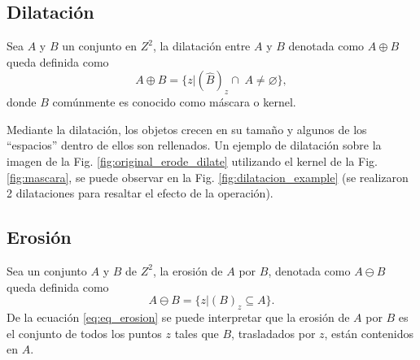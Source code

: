 \subsection{Dilatación}
Sea $A$ y $B$ un conjunto en $Z^2$, la dilatación entre $A$ y $B$ denotada como $A \oplus B$ queda definida como
\begin{equation}
A\oplus B=\{z|(\hat{B})_{z}\cap\; A \neq \varnothing\},
\label{eq:eq_dilatacion}
\end{equation}
donde $B$ comúnmente es conocido como máscara o kernel.

Mediante la dilatación, los objetos crecen en su tamaño y algunos de los ``espacios'' dentro de ellos son rellenados. Un ejemplo de dilatación sobre la imagen de la Fig. \ref{fig:original_erode_dilate} utilizando el kernel de la Fig. \ref{fig:mascara}, se puede observar en la Fig. \ref{fig:dilatacion_example} (se realizaron 2 dilataciones para resaltar el efecto de la operación).
\subsection{Erosión}
Sea un conjunto $A$ y $B$ de $Z^2$, la erosión de $A$ por $B$, denotada como $A \ominus B$ queda definida como
\begin{equation}
A \ominus B=\{z|(B)_{z} \subseteq A\}.
\label{eq:eq_erosion}
\end{equation}
De la ecuación \eqref{eq:eq_erosion} se puede interpretar que la erosión de $A$ por $B$ es el conjunto de todos los puntos $z$ tales que $B$, trasladados por $z$, están contenidos en $A$.

